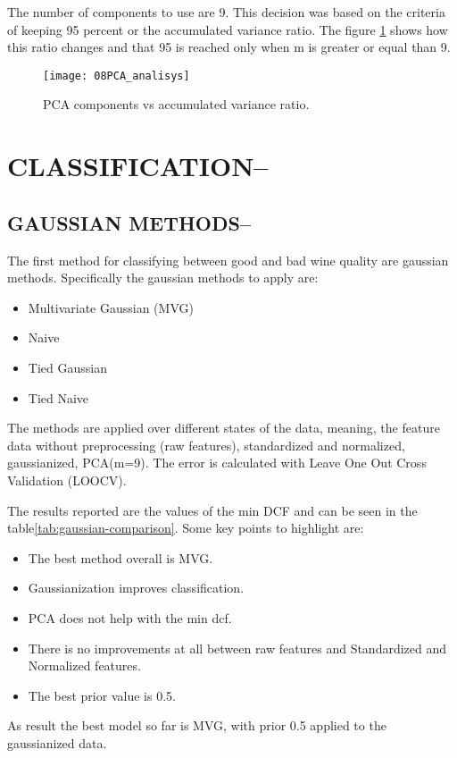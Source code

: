 \documentclass[12pt, twocolumn]{article}
\begin{document}
  The number of components to use are 9.
  This decision was based on the criteria of keeping 95 percent or the
  accumulated variance ratio.
  The figure \ref{fig:08PCA_analisys} shows how this ratio changes and that
  95 is reached only when m is greater or equal than 9.

  \begin{figure}[h]
    \centering
    \texttt{[image: 08PCA\_analisys]}
    \caption{PCA components vs accumulated variance ratio.}
    \label{fig:08PCA_analisys}
  \end{figure}


  \section{CLASSIFICATION--}
  \subsection{GAUSSIAN METHODS-- }
  The first method for classifying between good and bad wine quality are
  gaussian methods.
  Specifically the gaussian methods to apply are:
  \begin{itemize}
    \item Multivariate Gaussian (MVG)
    \item Naive
    \item Tied Gaussian
    \item Tied Naive
  \end{itemize}
  The methods are applied over different states of the data, meaning, the
  feature data without preprocessing (raw features), standardized and
  normalized, gaussianized, PCA(m=9). The error is calculated with Leave One
  Out Cross Validation (LOOCV).

  The results reported are the values of the min DCF and can be seen in the table\ref{tab:gaussian-comparison}.
  Some key points to highlight are:
  \begin{itemize}
    \item The best method overall is MVG.
    \item Gaussianization improves classification.
    \item PCA does not help with the min dcf.
    \item There is no improvements at all between raw features and
    Standardized and Normalized features.
    \item The best prior value is 0.5.
  \end{itemize}
  As result the best model so far is MVG, with prior 0.5 applied to the
  gaussianized data.
  
\end{document}
